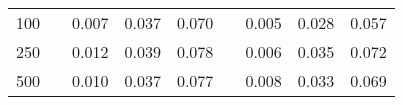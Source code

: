 % 
\begin{tabular}{ccccccccc}
  \hline
  \hline
100 &  & 0.007 & 0.037 & 0.070 &  & 0.005 & 0.028 & 0.057 \\ 
  250 &  & 0.012 & 0.039 & 0.078 &  & 0.006 & 0.035 & 0.072 \\ 
  500 &  & 0.010 & 0.037 & 0.077 &  & 0.008 & 0.033 & 0.069 \\ 
   \hline
\end{tabular}

